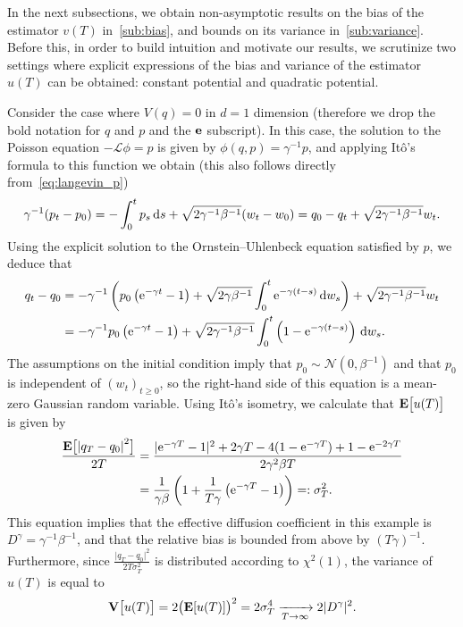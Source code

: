 \documentclass[11pt,a4paper]{article}
\begin{document}
In the next subsections,
we obtain non-asymptotic results on the bias of the estimator $v(T)$ in~\cref{sub:bias},
and bounds on its variance in~\cref{sub:variance}.
Before this,
in order to build intuition and motivate our results,
we scrutinize two settings where
explicit expressions of the bias and variance of the estimator $u(T)$ can be obtained:
constant potential and quadratic potential.
\begin{example}
    \label{example:constant}
    Consider the case where $V(q) = 0$ in $d = 1$ dimension
    (therefore we drop the bold notation for $q$ and $p$ and the $\boldsymbol{\mathbf e}$ subscript).
    In this case, the solution to the Poisson equation $- \mathcal L \phi = p$ is given by $\phi(q, p) = \gamma^{-1} p$,
    and applying Itô's formula to this function we obtain
    (this also follows directly from~\eqref{eq:langevin_p})
    \[
        \gamma^{-1}(p_t - p_0) = - \int_{0}^{t} p_s \, \mathrm d s + \sqrt{2 \gamma^{-1} \beta^{-1}} (w_t - w_0)
        = q_0 - q_t + \sqrt{2 \gamma^{-1} \beta^{-1}} w_t.
    \]
    Using the explicit solution to the Ornstein--Uhlenbeck equation satisfied by $p$,
    we deduce that
    \begin{align*}
        q_t - q_0
        &= - \gamma^{-1} \left( p_0 \left(\mathrm{e}^{-\gamma t} - 1\right) + \sqrt{2 \gamma \beta^{-1}}\int_{0}^{t} \mathrm{e}^{-\gamma (t - s)} \, \mathrm d w_s \right)
        + \sqrt{2 \gamma^{-1} \beta^{-1}} w_t \\
        &=  - \gamma^{-1} p_0 \left(\mathrm{e}^{-\gamma t} - 1\right) + \sqrt{2 \gamma^{-1} \beta^{-1}}\int_{0}^{t} \left(1 - \mathrm{e}^{-\gamma (t - s)}\right) \, \mathrm d w_s.
    \end{align*}
    The assumptions on the initial condition imply that $p_0 \sim \mathcal N(0, \beta^{-1})$ and that $p_0$ is independent of $(w_t)_{t \geq 0}$,
    so the right-hand side of this equation is a mean-zero Gaussian random variable.
    Using It\^o's isometry, we calculate that $\mathbf{E} \bigl[ u(T) \bigr]$ is given by
    \begin{align*}
        \frac{\expect \bigl[\abs{q_T - q_0}^2\bigr]}{2T}
        &= \frac{\lvert \e^{-\gamma T} - 1 \rvert^2 + 2 \gamma T - 4 (1 - \e^{-\gamma T}) +  1 - \e^{-2 \gamma T}}{2 \gamma^2 \beta T} \\
        &= \frac{1}{\gamma \beta} \left( 1 + \frac{1}{T \gamma} \left(\e^{-\gamma T} - 1\right) \right) =: \sigma_T^2.
    \end{align*}
    This equation implies that the effective diffusion coefficient in this example is $D^{\gamma} = \gamma^{-1} \beta^{-1}$,
    and that the relative bias is bounded from above by $(T \gamma)^{-1}$.
    Furthermore,
    since $\frac{\lvert q_T- q_0 \rvert^2}{2T\sigma_T^2}$ is distributed according to $\chi^2(1)$,
    the variance of $u(T)$ is equal to
    \[
        \mathbf{V} \bigl[u(T)\bigr] = 2  \bigl(\mathbf{E} [u(T)]\bigr)^2 = 2 \sigma_T^4 \xrightarrow[T \to \infty]{} 2 \lvert D^{\gamma} \rvert^2 .
    \]
\end{example}
\end{document}
